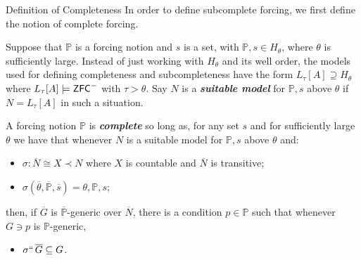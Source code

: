 \documentclass[utf8x,xcolor=svgnames,8pt]{beamer}
\renewcommand{\P}{\mathbb{P}}
\newcommand{\N}{{\overline{N}}}
\renewcommand{\G}{\overline{G}}
\newcommand{\ZFC}{\textup{\ensuremath{\textsf{ZFC}}}}
\begin{document}
\begin{frame}{Definition of Completeness}
In order to define subcomplete forcing, we first define the notion of complete forcing. 

\vspace{1em}

Suppose that $\P$ is a forcing notion and $s$ is a set, with $\P, s \in H_\theta$, where $\theta$ is sufficiently large. Instead of just working with $H_\theta$ and its well order, the models used for defining completeness and subcompleteness have the form $L_\tau[A] \supseteq H_\theta$ where $L_\tau[A] \models \ZFC^-$ with $\tau>\theta$. Say $N$ is a \emph{\textbf{suitable model}} for $\P,s$ above $\theta$ if $N=L_\tau[A]$ in such a situation.
\begin{definition}
A forcing notion $\P$ is \emph{\textbf{complete}} so long as, for any set $s$ and for sufficiently large $\theta$ we have that whenever $N$ is a suitable model for $\P,s$ above $\theta$ and: \begin{itemize}
	\item $\sigma: \N \cong X \prec N$ where $X$ is countable and $\N$ is transitive;
	\item $\sigma(\overline \theta, \overline{\P}, \overline s)=\theta, \P, s$;
\end{itemize}
then, if $\overline G$ is $\overline{\P}$-generic over $\N$, there is a condition $p \in \P$ such that whenever $G \ni p$ is $\P$-generic, 
\begin{itemize}
	\item $\sigma ``\, \G \subseteq G$. 
\end{itemize}


\end{definition}
\end{frame}
\end{document}
